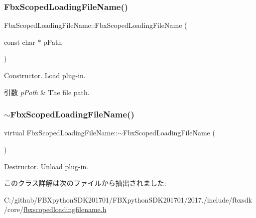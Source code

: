 \subsubsection{\texorpdfstring{Fbx\+Scoped\+Loading\+File\+Name()}{FbxScopedLoadingFileName()}}
{\footnotesize\ttfamily Fbx\+Scoped\+Loading\+File\+Name\+::\+Fbx\+Scoped\+Loading\+File\+Name (\begin{DoxyParamCaption}\item[{const char $\ast$}]{p\+Path }\end{DoxyParamCaption})\hspace{0.3cm}{\ttfamily [explicit]}}

Constructor. Load plug-\/in. 
\begin{DoxyParams}{引数}
{\em p\+Path} & The file path. \\
\hline
\end{DoxyParams}
\mbox{\label{class_fbx_scoped_loading_file_name_a2f15050815bcb12cdd1b461e619374d6}} 
\subsubsection{\texorpdfstring{$\sim$\+Fbx\+Scoped\+Loading\+File\+Name()}{~FbxScopedLoadingFileName()}}
{\footnotesize\ttfamily virtual Fbx\+Scoped\+Loading\+File\+Name\+::$\sim$\+Fbx\+Scoped\+Loading\+File\+Name (\begin{DoxyParamCaption}{ }\end{DoxyParamCaption})\hspace{0.3cm}{\ttfamily [virtual]}}

Destructor. Unload plug-\/in. 

このクラス詳解は次のファイルから抽出されました\+:\begin{DoxyCompactItemize}
\item 
C\+:/github/\+F\+B\+Xpython\+S\+D\+K201701/\+F\+B\+Xpython\+S\+D\+K201701/2017./include/fbxsdk/core/\hyperlink{fbxscopedloadingfilename_8h}{fbxscopedloadingfilename.\+h}\end{DoxyCompactItemize}
